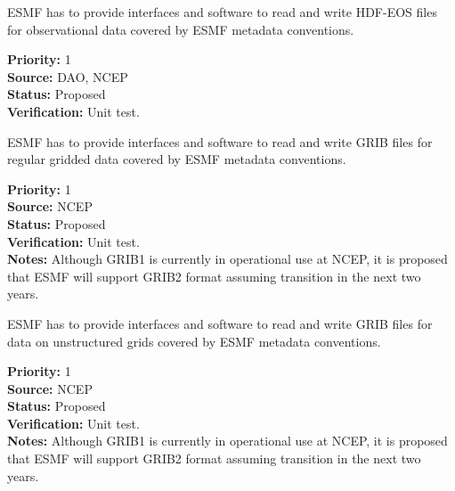 
ESMF has to provide interfaces and software to read and write HDF-EOS
files for observational data  covered by ESMF metadata conventions.


\begin{reqlist}
{\bf Priority:} 1 \\
{\bf Source:} DAO, NCEP \\
{\bf Status:} Proposed \\
{\bf Verification:} Unit test. \\
\end{reqlist}




ESMF has to provide interfaces and software to read and write GRIB
files for regular gridded data covered by ESMF metadata conventions.

\begin{reqlist}
{\bf Priority:} 1 \\
{\bf Source:} NCEP \\
{\bf Status:} Proposed \\
{\bf Verification:} Unit test. \\
{\bf Notes:} Although GRIB1 is currently in operational use at NCEP,
it is proposed that ESMF will support GRIB2 format assuming transition
in the next two years.
\end{reqlist}




ESMF has to provide interfaces and software to read and write GRIB
files for data on unstructured grids covered by ESMF metadata conventions.

\begin{reqlist}
{\bf Priority:} 1 \\
{\bf Source:} NCEP \\
{\bf Status:} Proposed \\
{\bf Verification:} Unit test. \\
{\bf Notes:} Although GRIB1 is currently in operational use at NCEP,
it is proposed that ESMF will support GRIB2 format assuming transition
in the next two years.
\end{reqlist}



